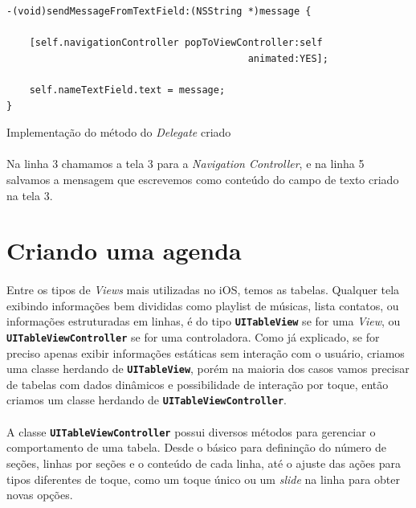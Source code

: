 \documentclass[a4paper,12pt,brazil,doubleside]{book}
\begin{document}
\begin{singlespace}
\begin{listing}[H]
\begin{verbatim}
-(void)sendMessageFromTextField:(NSString *)message {
    
    [self.navigationController popToViewController:self
                                          animated:YES];
    
    self.nameTextField.text = message;
}
\end{verbatim}
\caption{Implementação do método do \emph{Delegate} criado}
\end{listing}

\paragraph{}Na linha 3 chamamos a tela 3 para a \emph{Navigation Controller}, e na linha 5 salvamos a mensagem que escrevemos como conteúdo do campo de texto criado na tela 3.

\bigskip
\bigskip


\section{Criando uma agenda}

\paragraph{}Entre os tipos de \emph{Views} mais utilizadas no iOS, temos as tabelas. Qualquer tela exibindo informações bem divididas como playlist de músicas, lista contatos, ou informações estruturadas em linhas, é do tipo \texttt{\textbf{UITableView}} se for uma \emph{View}, ou \texttt{\textbf{UITableViewController}} se for uma controladora. Como já explicado, se for preciso apenas exibir informações estáticas sem interação com o usuário, criamos uma classe herdando de \texttt{\textbf{UITableView}}, porém na maioria dos casos vamos precisar de tabelas com dados dinâmicos e possibilidade de interação por toque, então criamos um classe herdando de \texttt{\textbf{UITableViewController}}.
\paragraph{}A classe \texttt{\textbf{UITableViewController}} possui diversos métodos para gerenciar o comportamento de uma tabela. Desde o básico para defininção do número de seções, linhas por seções e o conteúdo de cada linha, até o ajuste das ações para tipos diferentes de toque, como um toque único ou um \emph{slide} na linha para obter novas opções.

\end{singlespace}
\end{document}
